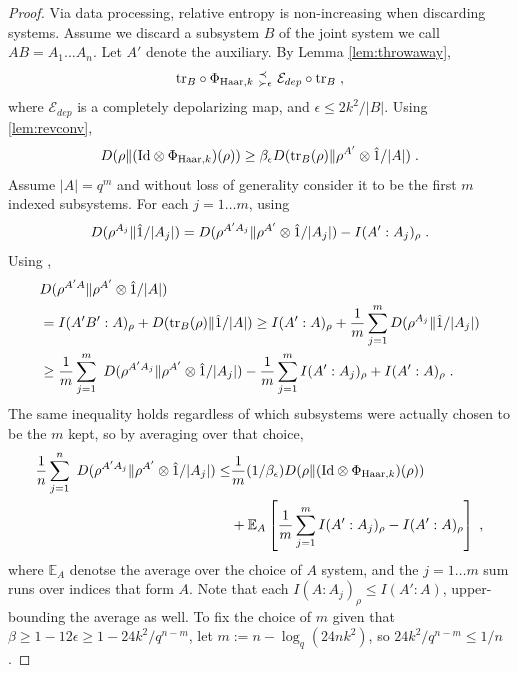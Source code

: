 \documentclass[11pt,reqno]{amsart}
\newcommand{\EE}{\mathbb{E}}
\newcommand{\E}{\mathcal{E}}
\newcommand{\id}{\hat{1}}
\newcommand{\Id}{\mathrm{Id}}
\newcommand{\pl}{\hspace{.1cm}}
\newcommand{\tr}{\text{tr}}
\newcommand{\precsucc}[2]{\text{ } {}^{\prec {#2}}_{\succ {#1}} \text{ } }
\begin{document}
\begin{proof}
    Via data processing, relative entropy is non-increasing when discarding systems. Assume we discard a subsystem $B$ of the joint system we call $AB = A_1 \dots A_n$. Let $A'$ denote the auxiliary. By Lemma \ref{lem:throwaway},
    \begin{equation}
        \tr_B \circ \Phi_{\mathrm{Haar},k} \precsucc{\epsilon}{} \E_{dep} \circ \tr_B \pl,
    \end{equation}
    where $\E_{dep}$ is a completely depolarizing map, and $\epsilon \leq 2 k^2 / |B|$. Using \ref{lem:revconv},
    \begin{equation}
        D(\rho \| (\Id \otimes \Phi_{\mathrm{Haar},k})(\rho)) \geq 
            \beta_{\epsilon} D(\tr_{B}(\rho) \| \rho^{A'} \otimes \id/|A|) \pl.
    \end{equation}
    Assume $|A| = q^m$ and without loss of generality consider it to be the first $m$ indexed subsystems. 
    For each $j = 1 \dots m$, using \cite[Proposition 2]{capel_superadditivity_2018}
    \begin{equation}
        D(\rho^{A_j} \| \id / |A_j|) = D(\rho^{A' A_j} \| \rho^{A'} \otimes \id / |A_j|) - I(A' : A_j)_\rho \pl.
    \end{equation}
    Using \cite[Proposition 2]{capel_superadditivity_2018},
    \begin{equation}
    \begin{split}
        & D(\rho^{A'A} \| \rho^{A'} \otimes \id/|A|)
        \\ & = I(A'B' : A)_\rho + D(\tr_{B}(\rho) \| \id/|A|)
        \geq I(A' : A)_\rho + \frac{1}{m} \sum_{j = 1}^m D(\rho^{A_j} \| \id / |A_j|)
        \\ & \geq \frac{1}{m} \sum_{j=1}^m \ D(\rho^{A' A_j} \| \rho^{A'} \otimes \id / |A_j|)
            - \frac{1}{m} \sum_{j=1}^m I(A' : A_j)_\rho + I(A' : A)_\rho \pl.
    \end{split}
    \end{equation}
    The same inequality holds regardless of which subsystems were actually chosen to be the $m$ kept, so by averaging over that choice,
    \begin{equation}
    \begin{split}
        \frac{1}{n} \sum_{j=1}^n \ D(\rho^{A' A_j} \| \rho^{A'} \otimes \id / |A_j|)
            \leq & \frac{1}{m} (1 / \beta_{\epsilon}) D(\rho \| (\Id \otimes \Phi_{\mathrm{Haar},k})(\rho)) 
            \\ & + \EE_A \left [ \frac{1}{m} \sum_{j=1}^m I(A' : A_j)_\rho - I(A' : A)_\rho \right ] \pl,
    \end{split}
    \end{equation}
    where $\EE_A$ denotse the average over the choice of $A$ system, and the $j = 1 \dots m$ sum runs over indices that form $A$. Note that each $I(A : A_j)_\rho \leq I(A' : A)$, upper-bounding the average as well. To fix the choice of $m$ given that $\beta \geq 1 - 12 \epsilon \geq 1 - 24 k^2 / q^{n-m}$, let $m := n - \log_q (24 n k^2)$, so $24 k^2 / q^{n-m} \leq 1/n$.
\end{proof}
\end{document}
